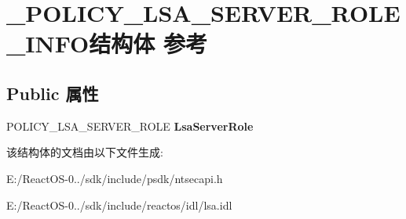 \hypertarget{struct___p_o_l_i_c_y___l_s_a___s_e_r_v_e_r___r_o_l_e___i_n_f_o}{}\section{\+\_\+\+P\+O\+L\+I\+C\+Y\+\_\+\+L\+S\+A\+\_\+\+S\+E\+R\+V\+E\+R\+\_\+\+R\+O\+L\+E\+\_\+\+I\+N\+F\+O结构体 参考}
\label{struct___p_o_l_i_c_y___l_s_a___s_e_r_v_e_r___r_o_l_e___i_n_f_o}
\subsection*{Public 属性}
\begin{DoxyCompactItemize}
\item 
\mbox{\label{struct___p_o_l_i_c_y___l_s_a___s_e_r_v_e_r___r_o_l_e___i_n_f_o_ab2cb1272692212a82d275b7516e78ce2}} 
P\+O\+L\+I\+C\+Y\+\_\+\+L\+S\+A\+\_\+\+S\+E\+R\+V\+E\+R\+\_\+\+R\+O\+LE {\bfseries Lsa\+Server\+Role}
\end{DoxyCompactItemize}


该结构体的文档由以下文件生成\+:\begin{DoxyCompactItemize}
\item 
E\+:/\+React\+O\+S-\/0../sdk/include/psdk/ntsecapi.\+h\item 
E\+:/\+React\+O\+S-\/0../sdk/include/reactos/idl/lsa.\+idl\end{DoxyCompactItemize}
